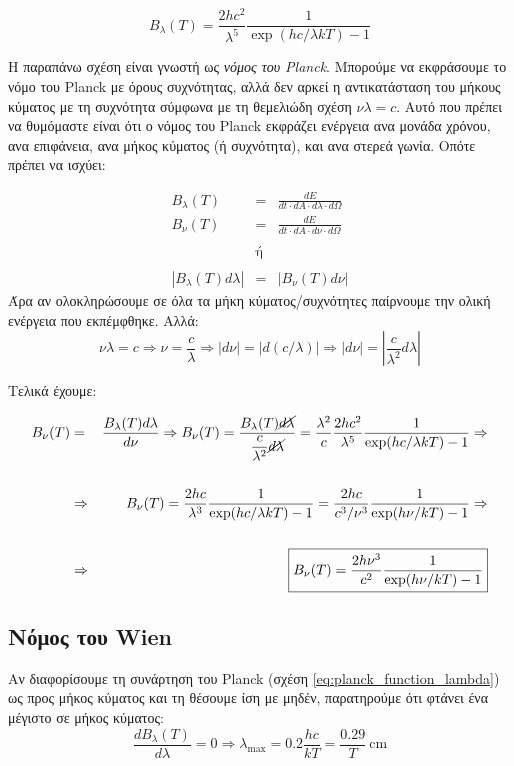\begin{equation}
    \label{eq:planck_function_lambda}
    B_{\lambda}(T) = \frac{2hc^2}{\lambda^5} \frac{1}{\exp(hc/\lambda kT) - 1}
\end{equation}

Η παραπάνω σχέση είναι γνωστή ως \textit{νόμος του Planck}. Μπορούμε να εκφράσουμε το νόμο του Planck με όρους συχνότητας, αλλά δεν αρκεί η αντικατάσταση του μήκους κύματος με τη συχνότητα σύμφωνα με τη θεμελιώδη σχέση $\nu \lambda = c$. Αυτό που πρέπει να θυμόμαστε είναι ότι ο νόμος του Planck εκφράζει ενέργεια ανα μονάδα χρόνου, ανα επιφάνεια, ανα μήκος κύματος (ή συχνότητα), και ανα στερεά γωνία. Οπότε πρέπει να ισχύει:

\begin{eqnarray*}
    B_{\lambda} (T) &=& \frac{dE}{dt \cdot dA \cdot d \lambda \cdot d \Omega} \\ 
    B_{\nu} (T) &=& \frac{dE}{dt \cdot dA \cdot d \nu \cdot d \Omega} \\\\
    &\text{ή}& \\\\
    |B_{\lambda} (T) d \lambda | &=& |B_{\nu} (T) d \nu |
\end{eqnarray*}
Άρα αν ολοκληρώσουμε σε όλα τα μήκη κύματος/συχνότητες παίρνουμε την ολική ενέργεια που εκπέμφθηκε. Αλλά: $$\nu \lambda = c \Rightarrow \nu = \frac{c}{\lambda} \Rightarrow |d\nu | = | d \left( c / \lambda \right) | \Rightarrow | d\nu | = \left | \frac{c}{\lambda^2}d\lambda \right |$$

Τελικά έχουμε:

\begin{eqnarray}
\label{eq:planck_function_frequency}
    B_{\nu}(T) &=& \frac{B_{\lambda}(T) d \lambda}{d\nu} \Rightarrow B_{\nu}(T) = \frac{B_{\lambda}(T) \cancel{d\lambda}}{\displaystyle  \frac{c}{\lambda^2} \cancel{d \lambda}} =  \frac{\lambda^2}{c} \frac{2hc^2}{\lambda^5} \frac{1}{\exp(hc / \lambda kT) - 1} \Rightarrow \nonumber \\ \nonumber \\
    &\Rightarrow & B_{\nu}(T) =  \frac{2hc}{\lambda^3} \frac{1}{\exp(hc / \lambda kT) - 1} =  \frac{2hc}{c^3 / \nu^3} \frac{1}{\exp(h \nu / kT) - 1} \Rightarrow \nonumber \\ \nonumber \\
    &\Rightarrow & \boxed{B_{\nu}(T) =  \frac{2h \nu^3}{c^2} \frac{1}{\exp(h \nu / kT) - 1}}
\end{eqnarray}


\subsection{Νόμος του Wien}
Αν διαφορίσουμε τη συνάρτηση του Planck (σχέση \eqref{eq:planck_function_lambda}) ως προς μήκος κύματος και τη θέσουμε ίση με μηδέν, παρατηρούμε ότι φτάνει ένα μέγιστο σε μήκος κύματος:
$$\frac{d B_{\lambda}(T)}{d \lambda} = 0 \Rightarrow \lambda_{\text{max}} = 0.2 \frac{hc}{kT} = \frac{0.29}{T} \ \text{cm}$$


